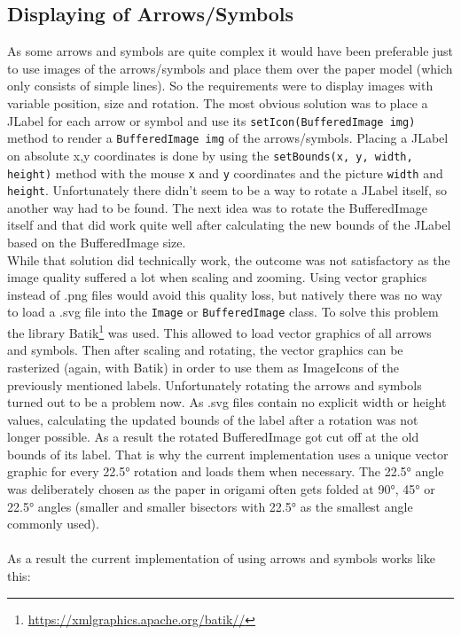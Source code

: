 \subsection{Displaying of Arrows/Symbols}
\label{sec:displaySymbols}
As some arrows and symbols are quite complex it would have been preferable just to use images of the arrows/symbols and place them over the  paper model (which only consists of simple lines). So the requirements were to display images with variable position, size and rotation. The most obvious solution was to place a JLabel for each arrow or symbol and use its \texttt{setIcon(BufferedImage img)} method to render a \texttt{BufferedImage img} of the arrows/symbols. Placing a JLabel on absolute x,y coordinates is done by using the \texttt{setBounds(x, y, width, height)} method with the mouse \texttt{x} and \texttt{y} coordinates and the picture \texttt{width} and \texttt{height}. Unfortunately there didn't seem to be a way to rotate a JLabel itself, so another way had to be found. The next idea was to rotate the BufferedImage itself and that did work quite well after calculating the new bounds of the JLabel based on the BufferedImage size.\\
While that solution did technically work, the outcome was not satisfactory as the image quality suffered a lot when scaling and zooming. Using vector graphics instead of .png files would avoid this quality loss, but natively there was no way to load a .svg file into the \texttt{Image} or \texttt{BufferedImage} class. To solve this problem the library Batik\footnote{\url{https://xmlgraphics.apache.org/batik//}} was used. This allowed to load vector graphics of all arrows and symbols. Then after scaling and rotating, the vector graphics can be rasterized (again, with Batik) in order to use them as ImageIcons of the previously mentioned labels. Unfortunately rotating the arrows and symbols turned out to be a problem now. As .svg files contain no explicit width or height values, calculating the updated bounds of the label after a rotation was not longer possible. As a result the rotated BufferedImage got cut off at the old bounds of its label. That is why the current implementation uses a unique vector graphic for every 22.5° rotation and loads them when necessary. The 22.5° angle was deliberately chosen as the paper in origami often gets folded at 90°, 45° or 22.5° angles (smaller and smaller bisectors with 22.5° as the smallest angle commonly used).\\%
\\
As a result the current implementation of using arrows and symbols works like this:

